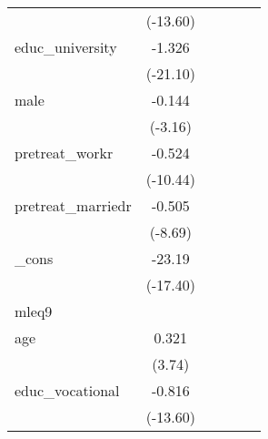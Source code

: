 {\begin{tabular}{l*{5}{c}}
            &    (-13.60)         &                     &                     &                     &                     \\
[1em]
educ\_university&      -1.326\sym{***}&                     &                     &                     &                     \\
            &    (-21.10)         &                     &                     &                     &                     \\
[1em]
male        &      -0.144\sym{**} &                     &                     &                     &                     \\
            &     (-3.16)         &                     &                     &                     &                     \\
[1em]
pretreat\_workr&      -0.524\sym{***}&                     &                     &                     &                     \\
            &    (-10.44)         &                     &                     &                     &                     \\
[1em]
pretreat\_marriedr&      -0.505\sym{***}&                     &                     &                     &                     \\
            &     (-8.69)         &                     &                     &                     &                     \\
[1em]
\_cons      &      -23.19\sym{***}&                     &                     &                     &                     \\
            &    (-17.40)         &                     &                     &                     &                     \\
\hline
mleq9       &                     &                     &                     &                     &                     \\
age         &       0.321\sym{***}&                     &                     &                     &                     \\
            &      (3.74)         &                     &                     &                     &                     \\
[1em]
educ\_vocational&      -0.816\sym{***}&                     &                     &                     &                     \\
            &    (-13.60)         &                     &                     &                     &                     \\

\end{tabular}}
